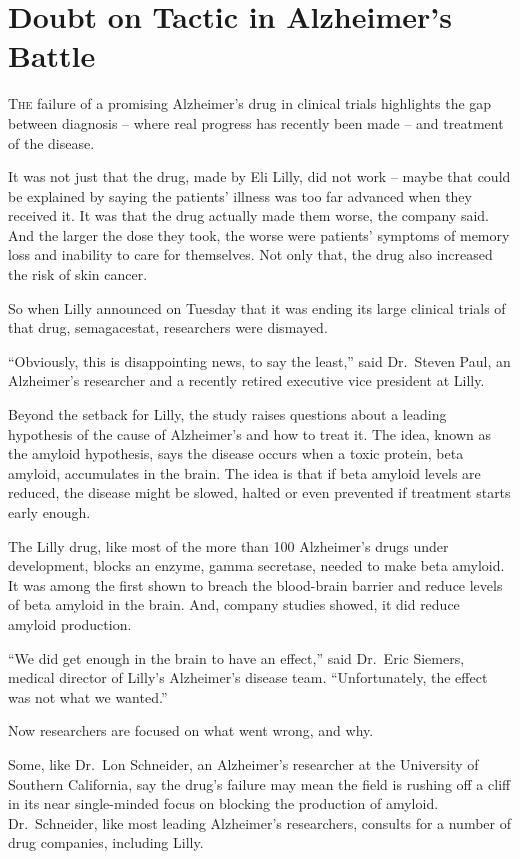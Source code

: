 ﻿\documentclass[12pt]{article}
\begin{document}
\section{Doubt on Tactic in Alzheimer's Battle}

\lettrine{T}{he} failure of a promising Alzheimer's drug in clinical trials
highlights the gap between diagnosis -- where real progress has recently been made -- and treatment
of the disease.

It was not just that the drug, made by Eli Lilly, did not work -- maybe that could be explained by
saying the patients' illness was too far advanced when they received it. It was that the drug
actually made them worse, the company said. And the larger the dose they took, the worse were
patients' symptoms of memory loss and inability to care for themselves. Not only that, the drug also
increased the risk of skin cancer.

So when Lilly announced on Tuesday that it was ending its large clinical trials of that drug,
semagacestat, researchers were dismayed.

``Obviously, this is disappointing news, to say the least,'' said Dr.~Steven Paul, an Alzheimer's
researcher and a recently retired executive vice president at Lilly.

Beyond the setback for Lilly, the study raises questions about a leading hypothesis of the cause of
Alzheimer's and how to treat it. The idea, known as the amyloid hypothesis, says the disease occurs
when a toxic protein, beta amyloid, accumulates in the brain. The idea is that if beta amyloid
levels are reduced, the disease might be slowed, halted or even prevented if treatment starts early
enough.

The Lilly drug, like most of the more than 100 Alzheimer's drugs under development, blocks an
enzyme, gamma secretase, needed to make beta amyloid. It was among the first shown to breach the
blood-brain barrier and reduce levels of beta amyloid in the brain. And, company studies showed, it
did reduce amyloid production.

``We did get enough in the brain to have an effect,'' said Dr.~Eric Siemers, medical director of
Lilly's Alzheimer's disease team. ``Unfortunately, the effect was not what we wanted.''

Now researchers are focused on what went wrong, and why.

Some, like Dr.~Lon Schneider, an Alzheimer's researcher at the University of Southern California,
say the drug's failure may mean the field is rushing off a cliff in its near single-minded focus on
blocking the production of amyloid. Dr.~Schneider, like most leading Alzheimer's researchers,
consults for a number of drug companies, including Lilly.
\end{document}
